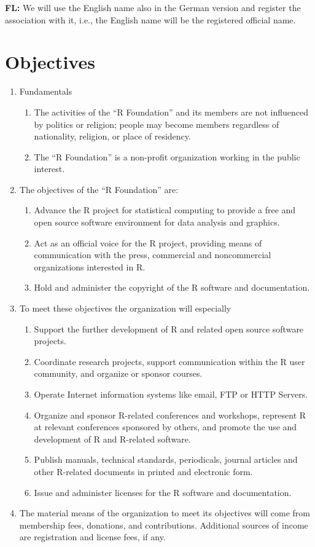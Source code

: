 \documentclass[a4paper]{article}
\newcommand{\note}[2]{{\it \par\noindent\textbf{#1:} #2}}
\newcommand{\RF}{``R Foundation''}
\begin{document}
\note{FL}{We will use the English name also in the German version and
  register the association with it, i.e., the English name will be the
  registered official name.}

\section{Objectives}

\begin{enumerate}
 \item Fundamentals
  \begin{enumerate}
   \item The activities of the \RF{} and its members are not
    influenced by politics or religion; people may become members
    regardless of nationality, religion, or place of residency.
   \item The \RF{} is a non-profit organization working in
    the public interest.
  \end{enumerate}
 \item The objectives of the \RF{} are:
  \begin{enumerate}
   \item Advance the R project for statistical computing to provide a
    free and open source software environment for data analysis and
    graphics. 
   \item Act as an official voice for the R project, providing means of
    communication with the press, commercial and noncommercial
    organizations interested in R.
   \item Hold and administer the copyright of the R software and
    documentation.
  \end{enumerate}

 \item To meet these objectives the organization will especially
  \begin{enumerate}
   \item Support the further development of R and related open source
    software projects.
   \item Coordinate research projects, support communication within
    the R user community, and organize or sponsor courses.
   \item Operate Internet information systems like email, FTP or HTTP
    Servers.
   \item Organize and sponsor R-related conferences and workshops,
    represent R at relevant conferences sponsored by others, and
    promote the use and development of R and R-related software.
   \item Publish manuals, technical standards, periodicals, journal
    articles and other R-related documents in printed and electronic
    form.
    \item Issue and administer licenses for the R software and
     documentation.
  \end{enumerate}
  
 \item The material means of the organization to meet its objectives
  will come from membership fees, donations, and contributions.
  Additional sources of income are registration and license fees, if
  any.
\end{enumerate}
\end{document}
